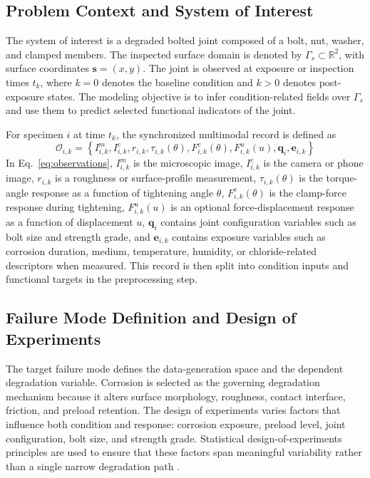 \documentclass[colorlinks,upint,subscriptcorrection,varvw,hyphenate,balance]{asmeconf}
\newcommand{\vect}[1]{\bm{#1}}
\newcommand{\surf}{\Gamma_s}
\newcommand{\R}{\mathbb{R}}
\begin{document}
\subsection{Problem Context and System of Interest}
The system of interest is a degraded bolted joint composed of a bolt, nut, washer, and clamped members. The inspected surface domain is denoted by $\surf\subset\R^2$, with surface coordinates $\vect{s}=(x,y)$. The joint is observed at exposure or inspection times $t_k$, where $k=0$ denotes the baseline condition and $k>0$ denotes post-exposure states. The modeling objective is to infer condition-related fields over $\surf$ and use them to predict selected functional indicators of the joint.

For specimen $i$ at time $t_k$, the synchronized multimodal record is defined as
\begin{equation}
\mathcal{O}_{i,k}=\left\{I^{m}_{i,k},I^{c}_{i,k},r_{i,k},\tau_{i,k}(\theta),F^{c}_{i,k}(\theta),F^{u}_{i,k}(u),\vect{q}_{i},\vect{e}_{i,k}\right\}
\label{eq:observations}
\end{equation}
In Eq.~\eqref{eq:observations}, $I^{m}_{i,k}$ is the microscopic image, $I^{c}_{i,k}$ is the camera or phone image, $r_{i,k}$ is a roughness or surface-profile measurement, $\tau_{i,k}(\theta)$ is the torque-angle response as a function of tightening angle $\theta$, $F^{c}_{i,k}(\theta)$ is the clamp-force response during tightening, $F^{u}_{i,k}(u)$ is an optional force-displacement response as a function of displacement $u$, $\vect{q}_{i}$ contains joint configuration variables such as bolt size and strength grade, and $\vect{e}_{i,k}$ contains exposure variables such as corrosion duration, medium, temperature, humidity, or chloride-related descriptors when measured. This record is then split into condition inputs and functional targets in the preprocessing step.

\subsection{Failure Mode Definition and Design of Experiments}
The target failure mode defines the data-generation space and the dependent degradation variable. Corrosion is selected as the governing degradation mechanism because it alters surface morphology, roughness, contact interface, friction, and preload retention. The design of experiments varies factors that influence both condition and response: corrosion exposure, preload level, joint configuration, bolt size, and strength grade. Statistical design-of-experiments principles are used to ensure that these factors span meaningful variability rather than a single narrow degradation path \cite{montgomery2017doe}.
\end{document}
